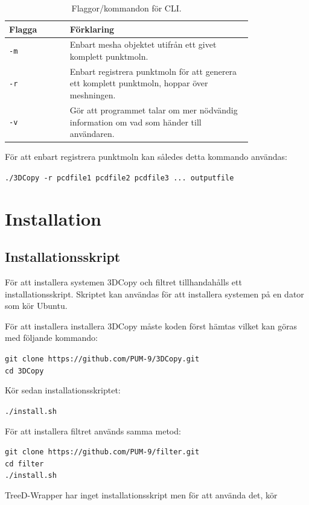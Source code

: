 \documentclass[a4paper,titlepage,12pt]{article}
\begin{document}
		\begin{table}[h!]
			\centering
			\caption{Flaggor/kommandon för CLI.}
			\label{tab:flaggor_cli}
			
			\begin{tabular}{p{0.2\linewidth}p{0.6\linewidth}}
				Flagga & Förklaring \\
				\hline
				\texttt{-m} & Enbart mesha objektet utifrån ett givet komplett punktmoln. \\
				\hline
				\texttt{-r} & Enbart registrera punktmoln för att generera ett komplett punktmoln, hoppar över meshningen. \\
				\hline
				\texttt{-v} & Gör att programmet talar om mer nödvändig information om vad som händer till användaren. \\
				\hline
			\end{tabular}
		\end{table}	
		
		För att enbart registrera punktmoln kan således detta kommando användas:
		
		\texttt{./3DCopy -r pcdfile1 pcdfile2 pcdfile3 ... outputfile}
\newpage
   
    
\section{Installation}
\subsection{Installationsskript}
	För att installera systemen 3DCopy och filtret tillhandahålls ett installationsskript. Skriptet kan användas för att installera systemen på en dator som kör Ubuntu.
	
	För att installera installera 3DCopy måste koden först hämtas vilket kan göras med följande kommando:
	
	\texttt{git clone https://github.com/PUM-9/3DCopy.git \\
	cd 3DCopy}
	
	Kör sedan installationsskriptet:
	
	\texttt{./install.sh}
	
	För att installera filtret används samma metod:
	
	\texttt{git clone https://github.com/PUM-9/filter.git \\
	cd filter \\
	./install.sh}
	
	TreeD-Wrapper har inget installationsskript men för att använda det, kör
	
\end{document}
